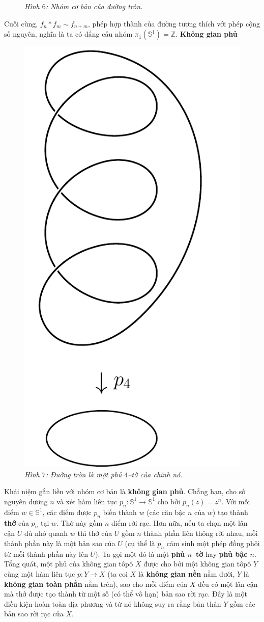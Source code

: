 \begin{multicols}{2}
\begin{figure}[H]
		\caption{\small\textit{\color{duongvaotoanhoc}Hình $6$: Nhóm cơ bản của đường tròn.}}
		\vspace*{-10pt}
	\end{figure}
	Cuối cùng, $f_n \ast f_m \sim f_{n+m}$, phép hợp thành của đường tương thích với phép cộng số nguyên, nghĩa là ta có đẳng cấu nhóm $\pi_1(\mathbb{S}^1) = \mathbb{Z}$.
	\vskip 0.1cm
	\textbf{\color{duongvaotoanhoc}Không gian phủ}
	\begin{figure}[H]
		\vspace*{-5pt}
		\centering
		\captionsetup{labelformat= empty, justification=centering}
		\includegraphics[width= 0.2\linewidth]{h7}
		\caption{\small\textit{\color{duongvaotoanhoc}Hình $7$: Đường tròn là một phủ $4$--tờ của chính nó.}}
		\vspace*{-10pt}
	\end{figure}
	Khái niệm gắn liền với nhóm cơ bản là {\bf\color{duongvaotoanhoc} không gian phủ}. Chẳng hạn, cho số nguyên dương $n$ và xét hàm liên tục $p_n: \mathbb{S}^1 \to \mathbb{S}^1$ cho bởi $p_n(z) = z^n$. Với mỗi điểm $w \in \mathbb{S}^1$, các điểm được $p_n$ biến thành $w$ (các căn bậc $n$ của $w$) tạo thành {\bf\color{duongvaotoanhoc} thớ} của $p_n$ tại $w$. Thớ này gồm $n$ điểm rời rạc. Hơn nữa, nếu ta chọn một lân cận $U$ đủ nhỏ quanh $w$ thì thớ của $U$ gồm $n$ thành phần liên thông rời nhau, mỗi thành phần này là một bản sao của $U$ (cụ thể là $p_n$ cảm sinh một phép đồng phôi từ mỗi thành phần này lên $U$). Ta gọi một đó là một {\bf\color{duongvaotoanhoc} phủ $n$--tờ} hay {\bf\color{duongvaotoanhoc} phủ bậc $n$}. 
	\vskip 0.1cm
	Tổng quát, một phủ của không gian tôpô $X$ được cho bởi một không gian tôpô $Y$ cùng một hàm liên tục $p: Y \to X$ (ta coi $X$ là {\bf\color{duongvaotoanhoc} không gian nền} nằm dưới, $Y$ là {\bf\color{duongvaotoanhoc} không gian toàn phần} nằm trên), sao cho mỗi điểm của $X$ đều có một lân cận mà thớ được tạo thành từ một số (có thể vô hạn) bản sao rời rạc. Đây là một điều kiện hoàn toàn địa phương và từ nó không suy ra rằng bản thân $Y$ gồm các bản sao rời rạc của $X$.

\end{multicols}
